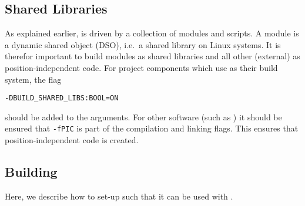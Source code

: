 \subsection{Shared Libraries}

As explained earlier, \MACI is driven by a collection of \PYTHON modules and \PYTHON scripts. A \PYTHON module is a dynamic shared object (DSO), i.e.~a shared library on Linux systems. It is therefor important to build \PYTHON modules as shared libraries and all other (external) as position-independent code. For project components which use \CMAKE as their build system, the flag
\begin{lstlisting}[style=SHELL]
	-DBUILD_SHARED_LIBS:BOOL=ON
\end{lstlisting}
should be added to the \CMAKE arguments. For other software (such as \LAMMPS) it should be ensured that \lstinline[style=CODE]|-fPIC| is part of the compilation and linking flags. This ensures that position-independent code is created.


\subsection{Building \LAMMPS}

Here, we describe how to set-up \LAMMPS such that it can be used with \MACI.

